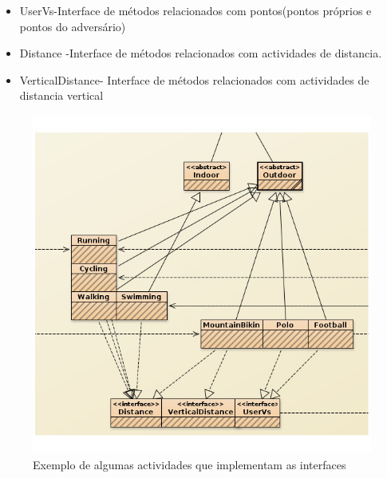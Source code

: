 \documentclass[10pt,notitlepage]{article}
\begin{document}
\begin{itemize}
\item UserVs-Interface de métodos relacionados com pontos(pontos próprios e pontos do adversário)
\item Distance -Interface de métodos relacionados com actividades de distancia.
\item VerticalDistance- Interface de métodos relacionados com actividades de distancia vertical

\end{itemize}
\begin{figure}[h]
\includegraphics[scale=0.5]{interfaceAct.jpg}
\caption{Exemplo de algumas actividades que implementam as interfaces}
\end{figure}
\end{document}
